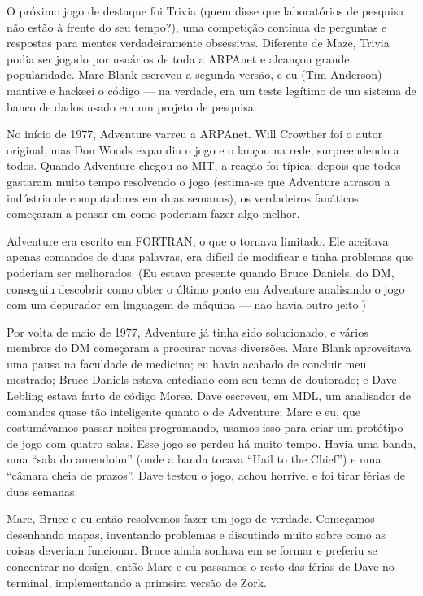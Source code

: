 \documentclass[12pt,a4paper]{article}
\begin{document}
O próximo jogo de destaque foi Trivia (quem disse que laboratórios de pesquisa não estão à frente do seu tempo?), uma competição contínua de perguntas e respostas para mentes verdadeiramente obsessivas. Diferente de Maze, Trivia podia ser jogado por usuários de toda a ARPAnet e alcançou grande popularidade. Marc Blank escreveu a segunda versão, e eu (Tim Anderson) mantive e hackeei o código — na verdade, era um teste legítimo de um sistema de banco de dados usado em um projeto de pesquisa.

No início de 1977, Adventure varreu a ARPAnet. Will Crowther foi o autor original, mas Don Woods expandiu o jogo e o lançou na rede, surpreendendo a todos. Quando Adventure chegou ao MIT, a reação foi típica: depois que todos gastaram muito tempo resolvendo o jogo (estima-se que Adventure atrasou a indústria de computadores em duas semanas), os verdadeiros fanáticos começaram a pensar em como poderiam fazer algo melhor.

Adventure era escrito em FORTRAN, o que o tornava limitado. Ele aceitava apenas comandos de duas palavras, era difícil de modificar e tinha problemas que poderiam ser melhorados. (Eu estava presente quando Bruce Daniels, do DM, conseguiu descobrir como obter o último ponto em Adventure analisando o jogo com um depurador em linguagem de máquina — não havia outro jeito.)

Por volta de maio de 1977, Adventure já tinha sido solucionado, e vários membros do DM começaram a procurar novas diversões. Marc Blank aproveitava uma pausa na faculdade de medicina; eu havia acabado de concluir meu mestrado; Bruce Daniels estava entediado com seu tema de doutorado; e Dave Lebling estava farto de código Morse. Dave escreveu, em MDL, um analisador de comandos quase tão inteligente quanto o de Adventure; Marc e eu, que costumávamos passar noites programando, usamos isso para criar um protótipo de jogo com quatro salas. Esse jogo se perdeu há muito tempo. Havia uma banda, uma “sala do amendoim” (onde a banda tocava “Hail to the Chief”) e uma “câmara cheia de prazos”. Dave testou o jogo, achou horrível e foi tirar férias de duas semanas.

Marc, Bruce e eu então resolvemos fazer um jogo de verdade. Começamos desenhando mapas, inventando problemas e discutindo muito sobre como as coisas deveriam funcionar. Bruce ainda sonhava em se formar e preferiu se concentrar no design, então Marc e eu passamos o resto das férias de Dave no terminal, implementando a primeira versão de Zork.
\end{document}
